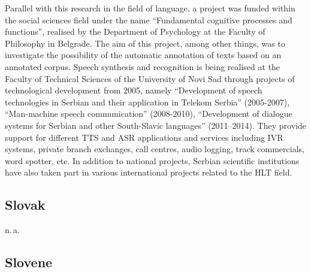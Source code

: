 \documentclass[10pt, plain]{../../metanetpaper}
\begin{document}
\begin{multicols}{2}
\begin{small}
Parallel with this research in the field of language, a project was funded within the social sciences field under the name “Fundamental cognitive processes and functions”, realised by the Department of Psychology at the Faculty of Philosophy in Belgrade. The aim of this project, among other things, was to investigate the possibility of the automatic annotation of texts based on an annotated corpus.  Speech synthesis and recognition is being realised at the Faculty of Technical Sciences of the University of Novi Sad through projects of technological development from 2005, namely “Development of speech technologies in Serbian and their application in Telekom Serbia” (2005-2007), “Man-machine speech communication” (2008-2010), “Development of dialogue systems for Serbian and other South-Slavic languages” (2011–2014). They provide support for different TTS and ASR applications and services including IVR systems, private branch exchanges, call centres, audio logging, track commercials, word spotter, etc.  In addition to national projects, Serbian scientific institutions have also taken part in various international projects related to the HLT field.

\subsection*{Slovak}
\label{sec:slovak}

n.\,a.

\subsection*{Slovene}
\label{sec:slovene}


\end{small}
\end{multicols}
\end{document}
